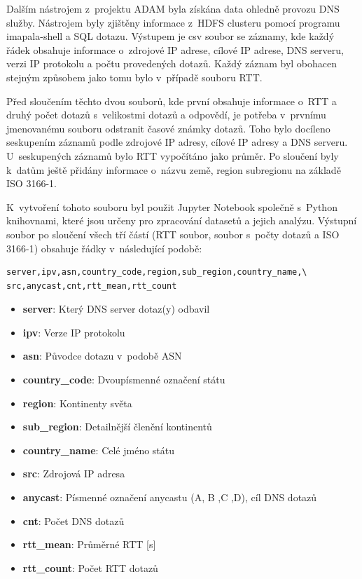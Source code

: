 \documentclass[thesis=M,czech]{src/FITthesis}[2019/12/23]
\begin{document}
Dalším nástrojem z~projektu ADAM byla získána data ohledně provozu DNS služby. Nástrojem byly zjištěny informace z~HDFS clusteru pomocí programu imapala-shell a SQL dotazu. Výstupem je csv soubor se záznamy, kde každý řádek obsahuje informace o~zdrojové IP adrese, cílové IP adrese, DNS serveru, verzi IP protokolu a počtu provedených dotazů. Každý záznam byl obohacen stejným způsobem jako tomu bylo v~případě souboru RTT.

Před sloučením těchto dvou souborů, kde první obsahuje informace o~RTT a druhý počet dotazů s~velikostmi dotazů a odpovědí, je potřeba v~prvnímu jmenovanému souboru odstranit časové známky dotazů. Toho bylo docíleno seskupením záznamů podle zdrojové IP adresy, cílové IP adresy a DNS serveru. U~seskupených záznamů bylo RTT vypočítáno jako průměr. Po sloučení byly k~datům ještě přidány informace o~názvu země, region subregionu na základě ISO 3166-1. \cite{iso-3166-1}

K~vytvoření tohoto souboru byl použit Jupyter Notebook společně s~Python knihovnami, které jsou určeny pro zpracování datasetů a jejich analýzu. Výstupní soubor po sloučení všech tří částí (RTT soubor, soubor s~počty dotazů a ISO 3166-1) obsahuje řádky v~následující podobě: 

\begin{verbatim}
server,ipv,asn,country_code,region,sub_region,country_name,\
src,anycast,cnt,rtt_mean,rtt_count
\end{verbatim}

\begin{itemize}
	\item \textbf{server}: Který DNS server dotaz(y) odbavil
	\item \textbf{ipv}: Verze IP protokolu
	\item \textbf{asn}: Původce dotazu v~podobě ASN
	\item \textbf{country\_code}: Dvoupísmenné označení státu
	\item \textbf{region}: Kontinenty světa
	\item \textbf{sub\_region}: Detailnější členění kontinentů
	\item \textbf{country\_name}: Celé jméno státu
	\item \textbf{src}: Zdrojová IP adresa
	\item \textbf{anycast}: Písmenné označení anycastu (A, B ,C ,D), cíl DNS dotazů
	\item \textbf{cnt}: Počet DNS dotazů
	\item \textbf{rtt\_mean}: Průměrné RTT [s]
	\item \textbf{rtt\_count}: Počet RTT dotazů
\end{itemize}
\end{document}
